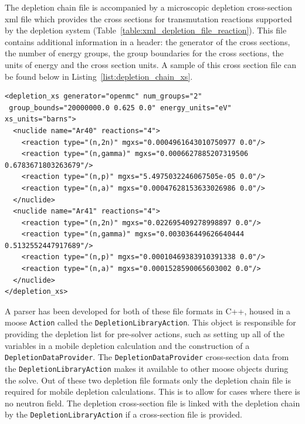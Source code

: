 The depletion chain file is accompanied by a microscopic depletion cross-section \acrshort{xml} file which provides the cross sections for transmutation reactions supported by the depletion system (Table~\ref{table:xml_depletion_file_reaction}). This file contains additional information in a header: the generator of the cross sections, the number of energy groups, the group boundaries for the cross sections, the units of energy and the cross section units. A sample of this cross section file can be found below in Listing~\ref{list:depletion_chain_xs}.
\begin{lstlisting}[label={list:depletion_chain_xs}, caption={Example depletion \acrshort{xml} cross-section file.}]
<depletion_xs generator="openmc" num_groups="2" 
 group_bounds="20000000.0 0.625 0.0" energy_units="eV" xs_units="barns">
  <nuclide name="Ar40" reactions="4">
    <reaction type="(n,2n)" mgxs="0.0004961643010750977 0.0"/>
    <reaction type="(n,gamma)" mgxs="0.0006627885207319506 0.6783671803263679"/>
    <reaction type="(n,p)" mgxs="5.4975032246067505e-05 0.0"/>
    <reaction type="(n,a)" mgxs="0.00047628153633026986 0.0"/>
  </nuclide>
  <nuclide name="Ar41" reactions="4">
    <reaction type="(n,2n)" mgxs="0.022695409278998897 0.0"/>
    <reaction type="(n,gamma)" mgxs="0.003036449626640444 0.5132552447917689"/>
    <reaction type="(n,p)" mgxs="0.00010469383910391338 0.0"/>
    <reaction type="(n,a)" mgxs="0.0001528590065603002 0.0"/>
  </nuclide>
</depletion_xs>
\end{lstlisting}
A parser has been developed for both of these file formats in C++, housed in a \acrshort{moose} \texttt{Action} called the \texttt{DepletionLibraryAction}. This object is responsible for providing the depletion list for pre-solver actions, such as setting up all of the variables in a mobile depletion calculation and the construction of a \texttt{DepletionDataProvider}. The \texttt{DepletionDataProvider} cross-section data from the \texttt{DepletionLibraryAction} makes it available to other \acrshort{moose} objects during the solve. Out of these two depletion file formats only the depletion chain file is required for mobile depletion calculations. This is to allow for cases where there is no neutron field. The depletion cross-section file is linked with the depletion chain by the \texttt{DepletionLibraryAction} if a cross-section file is provided.

